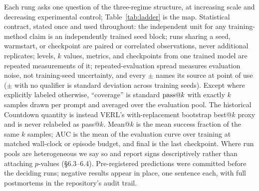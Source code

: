 Each rung asks one question of the three-regime structure, at
increasing scale and decreasing experimental control;
Table~\ref{tab:ladder} is the map. Statistical contract, stated once
and used throughout: the independent unit for any training-method
claim is an independently trained seed block; runs sharing a seed,
warmstart, or checkpoint are paired or correlated observations, never
additional replicates; levels, $k$ values, metrics, and checkpoints
from one trained model are repeated measurements of it;
repeated-evaluation spread measures evaluation noise, not
training-seed uncertainty, and every $\pm$ names its source at point
of use ($\pm$ with no qualifier is standard deviation across training
seeds). Except where explicitly labeled otherwise, ``coverage'' is
standard $\text{pass@}k$ with exactly $k$ samples drawn per prompt and
averaged over the evaluation pool. The historical Countdown quantity
is instead VERL's with-replacement bootstrap best@$k$ proxy and is
never relabeled as pass@$k$. Mean@$k$ is the mean success fraction of
the same $k$ samples; AUC is the mean of the evaluation curve over
training at matched wall-clock or episode budget, and final is the
last checkpoint. Where run pools are heterogeneous we
say so and report signs descriptively rather than attaching $p$-values
(\S 6.3--6.4). Pre-registered predictions were committed before the
deciding runs; negative results appear in place, one sentence each,
with full postmortems in the repository's audit trail.

